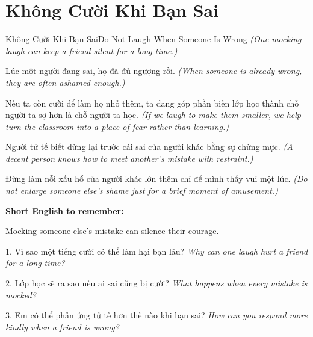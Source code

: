 \section{Không Cười Khi Bạn Sai}
\begin{truyen}{Không Cười Khi Bạn Sai}{Do Not Laugh When Someone Is Wrong}
\textit{(One mocking laugh can keep a friend silent for a long time.)}

Lúc một người đang sai, họ đã đủ ngượng rồi.
\textit{(When someone is already wrong, they are often ashamed enough.)}

Nếu ta còn cười để làm họ nhỏ thêm, ta đang góp phần biến lớp học thành chỗ người ta sợ hơn là chỗ người ta học.
\textit{(If we laugh to make them smaller, we help turn the classroom into a place of fear rather than learning.)}

Người tử tế biết dừng lại trước cái sai của người khác bằng sự chừng mực.
\textit{(A decent person knows how to meet another's mistake with restraint.)}
\end{truyen}

\begin{baihoc}
Đừng làm nỗi xấu hổ của người khác lớn thêm chỉ để mình thấy vui một lúc.
\textit{(Do not enlarge someone else's shame just for a brief moment of amusement.)}
\end{baihoc}

\begin{ghinhoanh}
\textbf{Short English to remember:}

Mocking someone else's mistake can silence their courage.

\end{ghinhoanh}

\begin{tuhocnhanh}
1. Vì sao một tiếng cười có thể làm hại bạn lâu? \textit{Why can one laugh hurt a friend for a long time?}

2. Lớp học sẽ ra sao nếu ai sai cũng bị cười? \textit{What happens when every mistake is mocked?}

3. Em có thể phản ứng tử tế hơn thế nào khi bạn sai? \textit{How can you respond more kindly when a friend is wrong?}
\end{tuhocnhanh}
\ngancach

